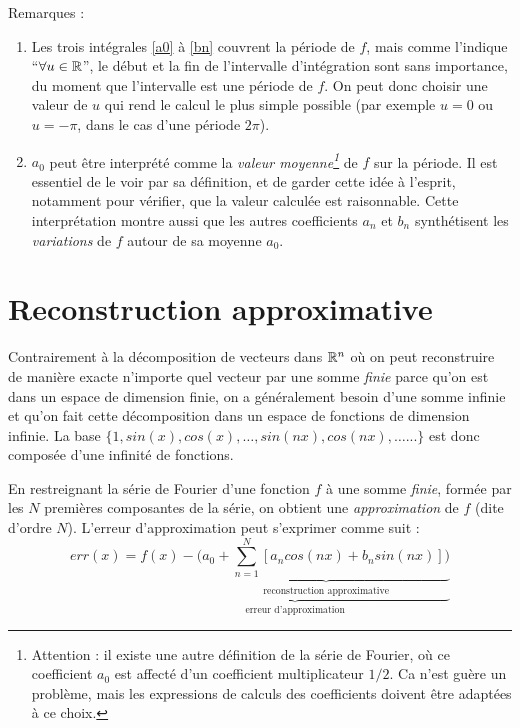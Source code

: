Remarques  :

\begin{enumerate}
\item Les trois intégrales \ref{a0} à \ref{bn}  couvrent la période de $f$,
  mais comme l'indique ``$\forall u\in \mathbb{R}$'', le début et la fin de
  l'intervalle d'intégration sont sans importance, du moment que
  l'intervalle est une période de $f$. On peut  donc choisir une
  valeur de $u$ qui rend le calcul le plus simple possible (par exemple $u=0$ ou $u=-\pi$, dans le cas d'une période $2\pi$).
\item $a_0$ peut être interprété comme la \emph{valeur
  moyenne\footnote{Attention : il existe une autre définition de la
  série de Fourier, où ce coefficient $a_0$ est affecté d'un
  coefficient multiplicateur $1/2$. Ca n'est guère un problème, mais
  les expressions de calculs des coefficients doivent être adaptées à
  ce choix.}} de $f$ sur la
  période. Il est essentiel de le voir par sa définition, et de garder
  cette idée à l'esprit, notamment pour vérifier, que la
  valeur calculée est raisonnable. Cette interprétation montre aussi que les autres
  coefficients $a_n$ et $b_n$ synthétisent les \emph{variations} de
  $f$ autour de sa moyenne $a_0$.
\end{enumerate}

\section{Reconstruction approximative} 

Contrairement à la décomposition de vecteurs dans $\mathbb{R}^n$ où on peut reconstruire de manière exacte n'importe quel vecteur par une somme \emph{finie} parce qu'on est dans un espace de dimension finie, on a généralement besoin d'une somme infinie et qu'on fait cette décomposition dans un espace de fonctions de dimension infinie. La base $\{1,sin(x),cos(x),\dots,sin(nx),cos(nx),\dots...\}$ est donc composée d'une infinité de fonctions.

En restreignant la série de Fourier d'une fonction $f$ à une somme
\emph{finie}, formée par les $N$ premières composantes de la série, on obtient une
\emph{approximation} de $f$ (dite d'ordre $N$). L'erreur d'approximation peut s'exprimer comme suit :
\begin{equation}
err(x)=\underbrace{  f(x)- \Big( \underbrace{a_0+\sum_{n=1}^{N}[a_n cos(nx) + b_n sin(nx)]\Big)}_{\text{reconstruction approximative}}}_{\text{erreur d'approximation}}
\label{erreur_approx}
\end{equation}

